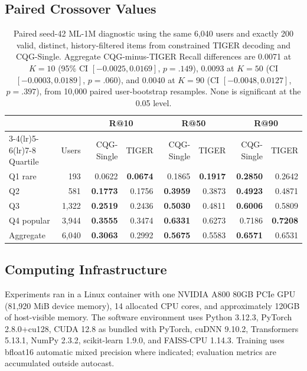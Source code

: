 \documentclass[letterpaper]{article}
\begin{document}
\subsection{Paired Crossover Values}
\label{app:crossover-values}

\begin{table}[H]
\centering
\small
\begin{tabular}{lrrrrrrr}
\toprule
 & & \multicolumn{2}{c}{R@10} & \multicolumn{2}{c}{R@50} & \multicolumn{2}{c}{R@90} \\
\cmidrule(lr){3-4}\cmidrule(lr){5-6}\cmidrule(lr){7-8}
Quartile & Users & CQG-Single & TIGER & CQG-Single & TIGER & CQG-Single & TIGER \\
\midrule
Q1 rare & 193 & 0.0622 & \textbf{0.0674} & 0.1865 & \textbf{0.1917} & \textbf{0.2850} & 0.2642 \\
Q2 & 581 & \textbf{0.1773} & 0.1756 & \textbf{0.3959} & 0.3873 & \textbf{0.4923} & 0.4871 \\
Q3 & 1,322 & \textbf{0.2519} & 0.2436 & \textbf{0.5030} & 0.4811 & \textbf{0.6006} & 0.5809 \\
Q4 popular & 3,944 & \textbf{0.3555} & 0.3474 & \textbf{0.6331} & 0.6273 & 0.7186 & \textbf{0.7208} \\
\midrule
Aggregate & 6,040 & \textbf{0.3063} & 0.2992 & \textbf{0.5675} & 0.5583 & \textbf{0.6571} & 0.6531 \\
\bottomrule
\end{tabular}
\caption{Paired seed-42 ML-1M diagnostic using the same 6,040 users and
exactly 200 valid, distinct, history-filtered items from constrained TIGER
decoding and CQG-Single. Aggregate CQG-minus-TIGER
Recall differences are 0.0071 at $K=10$ (95\% CI
$[-0.0025,0.0169]$, $p=.149$), 0.0093 at $K=50$ (CI
$[-0.0003,0.0189]$, $p=.060$), and 0.0040 at $K=90$ (CI
$[-0.0048,0.0127]$, $p=.397$), from 10,000 paired user-bootstrap
resamples. None is significant at the 0.05 level.}
\label{tab:crossover}
\end{table}

\subsection{Computing Infrastructure}
\label{app:infrastructure}

Experiments ran in a Linux container with one NVIDIA A800 80GB PCIe GPU
(81,920 MiB device memory), 14 allocated CPU cores, and approximately 120GB
of host-visible memory. The software environment uses Python 3.12.3,
PyTorch 2.8.0+cu128, CUDA 12.8 as bundled with PyTorch, cuDNN 9.10.2,
Transformers 5.13.1, NumPy 2.3.2, scikit-learn 1.9.0, and FAISS-CPU 1.14.3.
Training uses bfloat16 automatic mixed precision where indicated; evaluation
metrics are accumulated outside autocast.
\end{document}
